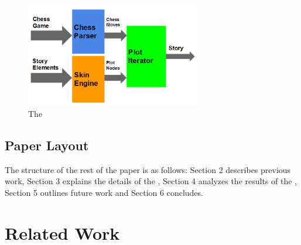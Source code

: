 \documentclass[journal]{./IEEEtran}
\begin{document}
\begin{figure}[h!]
\begin{center}
\includegraphics[width=3.0in]{./overview}
\end{center}
\caption{The \sysname{}}
\label{sysoverview}
\end{figure}

\subsection{Paper Layout}
The structure of the rest of the paper is as follows: Section 2 describes previous work, Section 3 explains the details of the \sysname{}, Section 4 analyzes the results of the \sysname{}, Section 5 outlines future work and Section 6 concludes. 

\section{Related Work}
\end{document}

